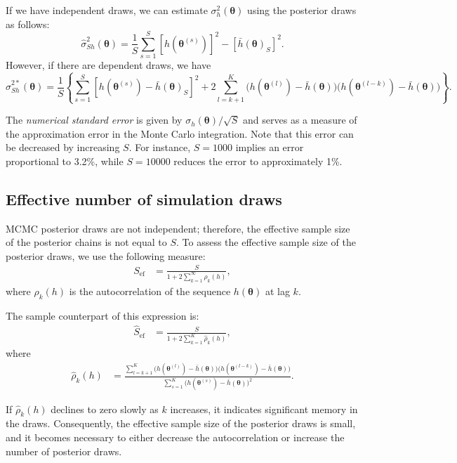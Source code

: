 If we have independent draws, we can estimate $\sigma^2_h(\bm{\theta})$ using the posterior draws as follows: 
\[
\hat{\sigma}^2_{Sh}(\bm{\theta}) = \frac{1}{S} \sum_{s=1}^S \left[h(\bm{\theta}^{(s)})\right]^2 - \left[\bar{h}(\bm{\theta})_S\right]^2.
\]
However, if there are dependent draws, we have
\[
\hat{\sigma}^{2*}_{Sh}(\bm{\theta}) = \frac{1}{S} \left\{\sum_{s=1}^S \left[h(\bm{\theta}^{(s)})-\bar{h}(\bm{\theta})_S\right]^2 + 2\sum_{l=k+1}^K \big(h(\bm{\theta}^{(l)}) - \bar{h}(\bm{\theta})\big)\big(h(\bm{\theta}^{(l-k)}) - \bar{h}(\bm{\theta})\big)\right\}.
\]

The \textit{numerical standard error} is given by $\sigma_h(\bm{\theta})/\sqrt{S}$ and serves as a measure of the approximation error in the Monte Carlo integration. Note that this error can be decreased by increasing $S$. For instance, $S = 1000$ implies an error proportional to 3.2\%, while $S = 10000$ reduces the error to approximately 1\%.
 
\subsection{Effective number of simulation draws}

MCMC posterior draws are not independent; therefore, the effective sample size of the posterior chains is not equal to $S$. To assess the effective sample size of the posterior draws, we use the following measure:
\begin{align*}
	S_{\text{ef}} &= \frac{S}{1 + 2\sum_{k=1}^{\infty} \rho_k(h)},
\end{align*}
where $\rho_k(h)$ is the autocorrelation of the sequence $h(\bm{\theta})$ at lag $k$.

The sample counterpart of this expression is:
\begin{align*}
	\hat{S}_{\text{ef}} &= \frac{S}{1 + 2\sum_{k=1}^{K} \hat{\rho}_k(h)},
\end{align*}
where
\begin{align*}
	\hat{\rho}_k(h) &= \frac{\sum_{l=k+1}^K \big(h(\bm{\theta}^{(l)}) - \bar{h}(\bm{\theta})\big)\big(h(\bm{\theta}^{(l-k)}) - \bar{h}(\bm{\theta})\big)}{\sum_{s=1}^K \big(h(\bm{\theta}^{(s)}) - \bar{h}(\bm{\theta})\big)^2}.
\end{align*}

If $\hat{\rho}_k(h)$ declines to zero slowly as $k$ increases, it indicates significant memory in the draws. Consequently, the effective sample size of the posterior draws is small, and it becomes necessary to either decrease the autocorrelation or increase the number of posterior draws.

